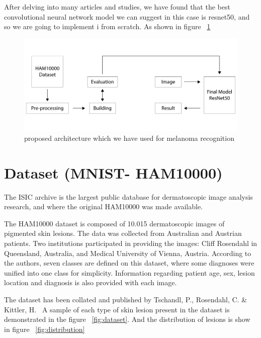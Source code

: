     After delving into many articles and studies, we have found that the best convolutional neural network model we can suggest in this case is resnet50, and so we are going to implement i from scratch. As shown in figure ~\ref{fig:architecture}

    \begin{figure}[htbp]
    \begin{center}
    \includegraphics[width=15cm]{./chapter-05-our-contribution/3.png}
    \end{center}
    \caption{proposed architecture which we have used for melanoma recognition}
    \label{fig:architecture}
    \end{figure}

\section{Dataset (MNIST- HAM10000)}

    The ISIC archive is the largest public database for dermatoscopic image analysis research, and where the original HAM10000 was made available.~\cite{JULIANA2021}

    The HAM10000 dataset is composed of 10.015 dermatoscopic images of pigmented skin lesions. The data was collected from Australian and Austrian patients. Two institutions participated in providing the images: Cliff Rosendahl in Queensland, Australia, and Medical University of Vienna, Austria. According to the authors, seven classes are defined on this dataset, where some diagnoses were unified into one class for simplicity. Information regarding patient age, sex, lesion location and diagnosis is also provided with each image. ~\cite{JULIANA2021}


    The dataset has been collated and published by Tschandl, P., Rosendahl, C. \& Kittler, H.~\cite{JULIANA2021} A sample of each type of skin lesion present in the dataset is demonstrated in the figure ~\ref{fig:dataset}. And the distribution of lesions is show in figure ~\ref{fig:distribution}

